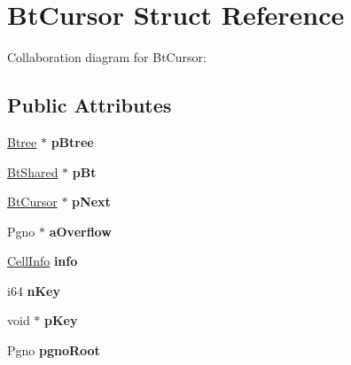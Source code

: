 \hypertarget{structBtCursor}{}\section{Bt\+Cursor Struct Reference}
\label{structBtCursor}


Collaboration diagram for Bt\+Cursor\+:
\subsection*{Public Attributes}
\begin{DoxyCompactItemize}
\item 
\hyperlink{structBtree}{Btree} $\ast$ {\bfseries p\+Btree}\hypertarget{structBtCursor_a2ad810542eaf99c9919c585624bead6f}{}\label{structBtCursor_a2ad810542eaf99c9919c585624bead6f}

\item 
\hyperlink{structBtShared}{Bt\+Shared} $\ast$ {\bfseries p\+Bt}\hypertarget{structBtCursor_a61c245712549192f7644e5ac23c00b74}{}\label{structBtCursor_a61c245712549192f7644e5ac23c00b74}

\item 
\hyperlink{structBtCursor}{Bt\+Cursor} $\ast$ {\bfseries p\+Next}\hypertarget{structBtCursor_ad2f8fe3aa7d3fa3309692b3e8a8c2395}{}\label{structBtCursor_ad2f8fe3aa7d3fa3309692b3e8a8c2395}

\item 
Pgno $\ast$ {\bfseries a\+Overflow}\hypertarget{structBtCursor_ae2dbcc15e63d349774a7ad6caef4d096}{}\label{structBtCursor_ae2dbcc15e63d349774a7ad6caef4d096}

\item 
\hyperlink{structCellInfo}{Cell\+Info} {\bfseries info}\hypertarget{structBtCursor_a9934b348c6e9f4808d8f98ea78788fbe}{}\label{structBtCursor_a9934b348c6e9f4808d8f98ea78788fbe}

\item 
i64 {\bfseries n\+Key}\hypertarget{structBtCursor_a23f6a271258c109aaeda0ba19e808f92}{}\label{structBtCursor_a23f6a271258c109aaeda0ba19e808f92}

\item 
void $\ast$ {\bfseries p\+Key}\hypertarget{structBtCursor_a3c979824f27f63678d7a2b02311bc330}{}\label{structBtCursor_a3c979824f27f63678d7a2b02311bc330}

\item 
Pgno {\bfseries pgno\+Root}\hypertarget{structBtCursor_a0b038f63a5b1b9df0b892e0773ffdd29}{}\label{structBtCursor_a0b038f63a5b1b9df0b892e0773ffdd29}


\end{DoxyCompactItemize}
